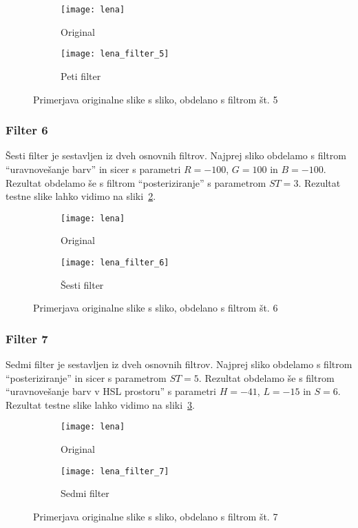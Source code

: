 \begin{figure}[!ht]
    \centering
    \begin{subfigure}[b]{0.4\textwidth}
        \texttt{[image: lena]}
        \caption{Original}
    \end{subfigure}
    \begin{subfigure}[b]{0.4\textwidth}
        \texttt{[image: lena\_filter\_5]}
        \caption{Peti filter}
    \end{subfigure}
    \caption{Primerjava originalne slike s sliko, obdelano s filtrom št. 5}
    \label{fig:lena_filter_5}
\end{figure}


\subsubsection*{Filter 6}
Šesti filter je sestavljen iz dveh osnovnih filtrov. Najprej sliko obdelamo s
filtrom ``uravnovešanje barv'' in sicer s parametri $R = -100$, $G = 100$ in
$B = -100$. Rezultat obdelamo še s filtrom ``posteriziranje'' s parametrom
$ST = 3$. Rezultat testne slike lahko vidimo na sliki~\ref{fig:lena_filter_6}.

\begin{figure}[!ht]
    \centering
    \begin{subfigure}[b]{0.4\textwidth}
        \texttt{[image: lena]}
        \caption{Original}
    \end{subfigure}
    \begin{subfigure}[b]{0.4\textwidth}
        \texttt{[image: lena\_filter\_6]}
        \caption{Šesti filter}
    \end{subfigure}
    \caption{Primerjava originalne slike s sliko, obdelano s filtrom št. 6}
    \label{fig:lena_filter_6}
\end{figure}


\subsubsection*{Filter 7}
Sedmi filter je sestavljen iz dveh osnovnih filtrov. Najprej sliko obdelamo s
filtrom ``posteriziranje'' in sicer s parametrom $ST = 5$. Rezultat obdelamo
še s filtrom ``uravnovešanje barv v HSL prostoru'' s parametri $H = -41$,
$L = -15$ in $S = 6$. Rezultat testne slike lahko vidimo na
sliki~\ref{fig:lena_filter_7}.

\begin{figure}[!ht]
    \centering
    \begin{subfigure}[b]{0.4\textwidth}
        \texttt{[image: lena]}
        \caption{Original}
    \end{subfigure}
    \begin{subfigure}[b]{0.4\textwidth}
        \texttt{[image: lena\_filter\_7]}
        \caption{Sedmi filter}
    \end{subfigure}
    \caption{Primerjava originalne slike s sliko, obdelano s filtrom št. 7}
    \label{fig:lena_filter_7}
\end{figure}


